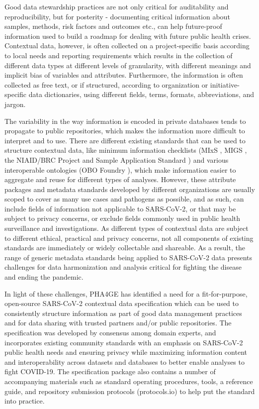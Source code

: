 Good data stewardship practices are not only critical for auditability and reproducibility, but for posterity - documenting critical information about samples, methods, risk factors and outcomes etc., can help future-proof information used to build a roadmap for dealing with future public health crises. Contextual data, however, is often collected on a project-specific basis according to local needs and reporting requirements which results in the collection of different data types at different levels of granularity, with different meanings and implicit bias of variables and attributes. Furthermore, the information is often collected as free text, or if structured, according to organization or initiative-specific data dictionaries, using different fields, terms, formats, abbreviations, and jargon.

The variability in the way information is encoded in private databases tends to propagate to public repositories, which makes the information more difficult to interpret and to use. There are different existing standards that can be used to structure contextual data, like minimum information checklists (MIxS \cite{yilmaz_minimum_2011}, MIGS \cite{field_minimum_2008}, the NIAID/BRC Project and Sample Application Standard \cite{dugan_standardized_2014}) and various interoperable ontologies (OBO Foundry \cite{smith_obo_2007}), which make information easier to aggregate and reuse for different types of analyses. However, these attribute packages and metadata standards developed by different organizations are usually scoped to cover as many use cases and pathogens as possible, and as such, can include fields of information not applicable to SARS-CoV-2, or that may be subject to privacy concerns, or exclude fields commonly used in public health surveillance and investigations. As different types of contextual data are subject to different ethical, practical and privacy concerns, not all components of existing standards are immediately or widely collectable and shareable. As a result, the range of generic metadata standards being applied to SARS-CoV-2 data presents challenges for data harmonization \cite{schriml_covid-19_2020} and analysis critical for fighting the disease and ending the pandemic. 

In light of these challenges, PHA4GE has identified a need for a fit-for-purpose, open-source SARS-CoV-2 contextual data specification which can be used to consistently structure information as part of good data management practices and for data sharing with trusted partners and/or public repositories. The specification was developed by consensus among domain experts, and incorporates existing community standards with an emphasis on SARS-CoV-2 public health needs and ensuring privacy while maximizing information content and interoperability across datasets and databases to better enable analyses to fight COVID-19. The specification package also contains a number of accompanying materials such as standard operating procedures, tools, a reference guide, and repository submission protocols (protocols.io) to help put the standard into practice.  

